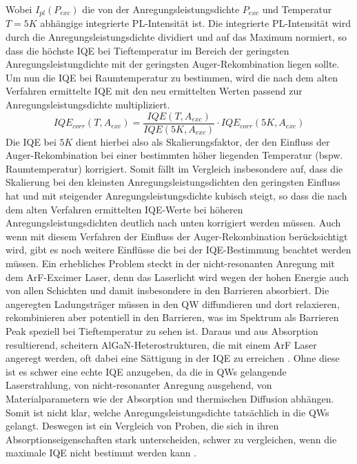 \noindent
\newline
Wobei $I_{pl}(P_{exc})$ die von der Anregungsleistungsdichte $P_{exc}$ und Temperatur $T = 5K$ abhängige integrierte PL-Intensität ist. Die integrierte PL-Intensität wird durch die Anregungsleistungsdichte dividiert und auf das Maximum normiert, so dass die höchste IQE bei Tieftemperatur im Bereich der geringsten Anregungsleistungdichte mit der geringsten Auger-Rekombination liegen sollte. Um nun die IQE bei Raumtemperatur zu bestimmen, wird die nach dem alten Verfahren ermittelte IQE mit den neu ermittelten Werten passend zur Anregungsleistungsdichte multipliziert. 
\begin{equation}
    IQE_{corr}(T, A_{exc}) = \frac{IQE(T,A_{exc})}{IQE(5K,A_{exc})} \cdot IQE_{corr}(5K,A_{exc})
    \label{eq:iqetrue300k}
\end{equation}
Die IQE bei $5K$ dient hierbei also als Skalierungsfaktor, der den Einfluss der Auger-Rekombination bei einer bestimmten höher liegenden Temperatur (bspw. Raumtemperatur) korrigiert. Somit fällt im Vergleich insbesondere auf, dass die Skalierung bei den kleinsten Anregungsleistungsdichten den geringsten Einfluss hat und mit steigender Anregungsleistungsdichte kubisch steigt, so dass die nach dem alten Verfahren ermittelten IQE-Werte bei höheren Anregungsleistungsdichten deutlich nach unten korrigiert werden müssen. \newline
Auch wenn mit diesem Verfahren der Einfluss der Auger-Rekombination berücksichtigt wird, gibt es noch weitere Einflüsse die bei der IQE-Bestimmung beachtet werden müssen. Ein erhebliches Problem steckt in der nicht-resonanten Anregung mit dem ArF-Excimer Laser, denn das Laserlicht wird wegen der hohen Energie auch von allen Schichten und damit insbesondere in den Barrieren absorbiert. Die angeregten Ladungsträger müssen in den QW diffundieren und dort relaxieren, rekombinieren aber potentiell in den Barrieren, was im Spektrum als Barrieren Peak speziell bei Tieftemperatur zu sehen ist.
\newline
Daraus und aus Absorption resultierend, scheitern AlGaN-Heterostrukturen, die mit einem ArF Laser angeregt werden, oft dabei eine Sättigung in der IQE zu erreichen \cite{doi:10.1063/1.4965298}. Ohne diese ist es schwer eine echte IQE anzugeben, da die in QWs gelangende Laserstrahlung, von nicht-resonanter Anregung ausgehend, von Materialparametern wie der Absorption und thermischen Diffusion abhängen. Somit ist nicht klar, welche Anregungsleistungsdichte tatsächlich in die QWs gelangt. Deswegen ist ein Vergleich von Proben, die sich in ihren Absorptionseigenschaften stark unterscheiden, schwer zu vergleichen, wenn die maximale IQE nicht bestimmt werden kann \cite{doi:10.1063/1.5044383}. 

